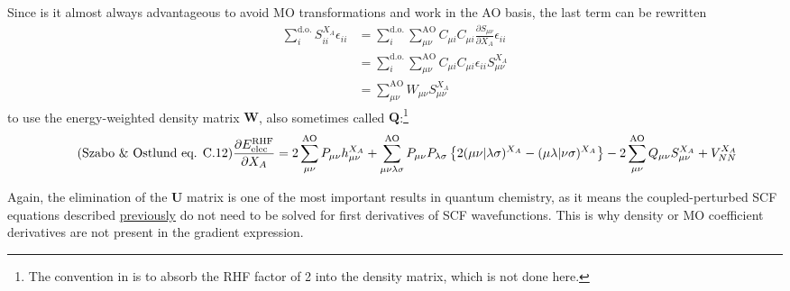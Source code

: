 \documentclass[%
class = book,%
crop = false,%
float = true,%
multi = true,%
preview = false,%
]{standalone}
\begin{document}
Since is it almost always advantageous to avoid MO transformations and work in the AO basis, the last term can be rewritten
\begin{equation}
  \tag{Yamaguchi eq. 4.24}
  \begin{aligned}
    \sum_{i}^{\text{d.o.}} S_{ii}^{X_{A}} \epsilon_{ii} &= \sum_{i}^{\text{d.o.}} \sum_{\mu\nu}^{\text{AO}} C_{\mu i} C_{\mu i} \frac{\partial S_{\mu\nu}}{\partial X_{A}} \epsilon_{ii} \\
    &= \sum_{i}^{\text{d.o.}} \sum_{\mu\nu}^{\text{AO}} C_{\mu i} C_{\mu i} \epsilon_{ii} S_{\mu\nu}^{X_{A}} \\
    &= \sum_{\mu\nu}^{\text{AO}} W_{\mu\nu} S_{\mu\nu}^{X_{A}}
  \end{aligned}
\end{equation}
to use the energy-weighted density matrix \(\mathbf{W}\), also sometimes called \(\mathbf{Q}\):\footnote{The convention in \szabo{} is to absorb the RHF factor of 2 into the density matrix, which is not done here.}
\begin{equation}
  \label{eq:szabo-c12}
  \tag{\szabo{} eq. C.12}
  \frac{\partial E_{\text{elec}}^{\text{RHF}}}{\partial X_{A}} = 2 \sum_{\mu\nu}^{\text{AO}} P_{\mu\nu} h_{\mu\nu}^{X_{A}} + \sum_{\mu\nu\lambda\sigma}^{\text{AO}} P_{\mu\nu}P_{\lambda\sigma} \left\{ 2(\mu\nu|\lambda\sigma)^{X_{A}} - (\mu\lambda|\nu\sigma)^{X_{A}} \right\} - 2 \sum_{\mu\nu}^{\text{AO}} Q_{\mu\nu} S_{\mu\nu}^{X_{A}} + V_{NN}^{X_{A}}
\end{equation}

Again, the elimination of the \(\mathbf{U}\) matrix is one of the most important results in quantum chemistry, as it means the coupled-perturbed SCF equations described \hyperlink{text:response-equation-description}{previously} do not need to be solved for first derivatives of SCF wavefunctions. This is why density or MO coefficient derivatives are not present in the gradient expression.
\end{document}
